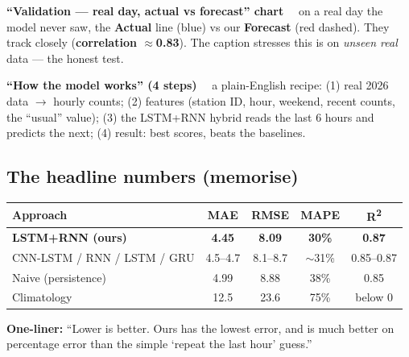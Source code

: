 \documentclass[11pt]{article}
\newcommand{\elem}[1]{\smallskip\noindent\textbf{\color{metroRed}#1}\ \ }
\begin{document}
\elem{``Validation --- real day, actual vs forecast'' chart} on a real day the model never saw, the
\textbf{Actual} line (blue) vs our \textbf{Forecast} (red dashed). They track closely
(\textbf{correlation $\approx$0.83}). The caption stresses this is on \emph{unseen real} data --- the
honest test.

\elem{``How the model works'' (4 steps)} a plain-English recipe: (1) real 2026 data $\rightarrow$
hourly counts; (2) features (station ID, hour, weekend, recent counts, the ``usual'' value);
(3) the LSTM+RNN hybrid reads the last 6 hours and predicts the next; (4) result: best scores,
beats the baselines.

\subsection{The headline numbers (memorise)}
\begin{center}
\begin{tabular}{lcccc}
\toprule
\textbf{Approach} & \textbf{MAE} & \textbf{RMSE} & \textbf{MAPE} & \textbf{R\textsuperscript{2}}\\
\midrule
\textbf{\color{metroRed}LSTM+RNN (ours)} & \textbf{4.45} & \textbf{8.09} & \textbf{30\%} & \textbf{0.87}\\
CNN-LSTM / RNN / LSTM / GRU & 4.5--4.7 & 8.1--8.7 & $\sim$31\% & 0.85--0.87\\
Naive (persistence)        & 4.99 & 8.88 & 38\% & 0.85\\
Climatology                & 12.5 & 23.6 & 75\% & below 0\\
\bottomrule
\end{tabular}
\end{center}
\noindent\textbf{One-liner:} ``Lower is better. Ours has the lowest error, and is much better on
percentage error than the simple `repeat the last hour' guess.''

\end{document}

